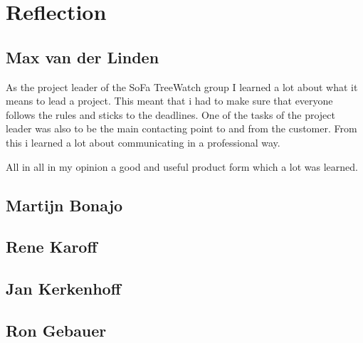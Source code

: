 \section{Reflection}
\subsection{Max van der Linden}
As the project leader of the SoFa TreeWatch group I learned a lot about what it means to lead a project. This meant that i had to make sure that everyone follows the rules and sticks to the deadlines. One of the tasks of the project leader was also to be the main contacting point to and from the customer. From this i learned a lot about communicating in a professional way.

All in all in my opinion a good and useful product form which a lot was learned.

\subsection{Martijn Bonajo}
\subsection{Rene Karoff}
\subsection{Jan Kerkenhoff}
\subsection{Ron Gebauer}
